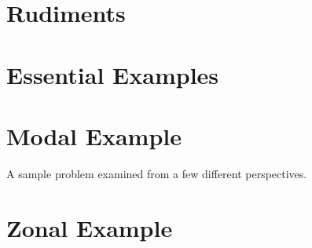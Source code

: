 \documentclass[10pt]{newsiambook}
\begin{document}
\frontmatter
%
\tableofcontents
%
\listoffigures
\listoftables
%
%
%



\mainmatter
\part{Rudiments}



\part{Essential Examples}


%

\part{Modal Example}
A sample problem examined from a few different perspectives.






\part{Zonal Example}






\end{document}
